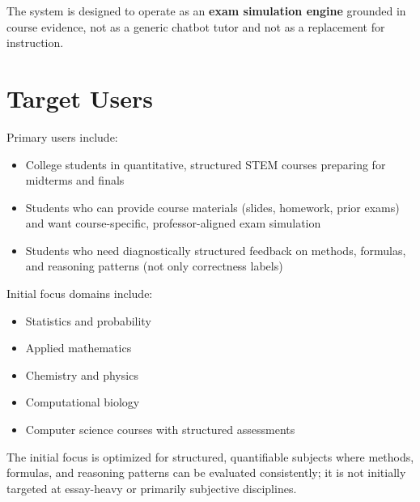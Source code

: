 \documentclass[11pt]{article}
\begin{document}
The system is designed to operate as an \textbf{exam simulation engine} grounded in course evidence, not as a generic chatbot tutor and not as a replacement for instruction.

\section{Target Users}
Primary users include:
\begin{itemize}
\item College students in quantitative, structured STEM courses preparing for midterms and finals
\item Students who can provide course materials (slides, homework, prior exams) and want course-specific, professor-aligned exam simulation
\item Students who need diagnostically structured feedback on methods, formulas, and reasoning patterns (not only correctness labels)
\end{itemize}

Initial focus domains include:
\begin{itemize}
\item Statistics and probability
\item Applied mathematics
\item Chemistry and physics
\item Computational biology
\item Computer science courses with structured assessments
\end{itemize}

The initial focus is optimized for structured, quantifiable subjects where methods, formulas, and reasoning patterns can be evaluated consistently; it is not initially targeted at essay-heavy or primarily subjective disciplines.
\end{document}

